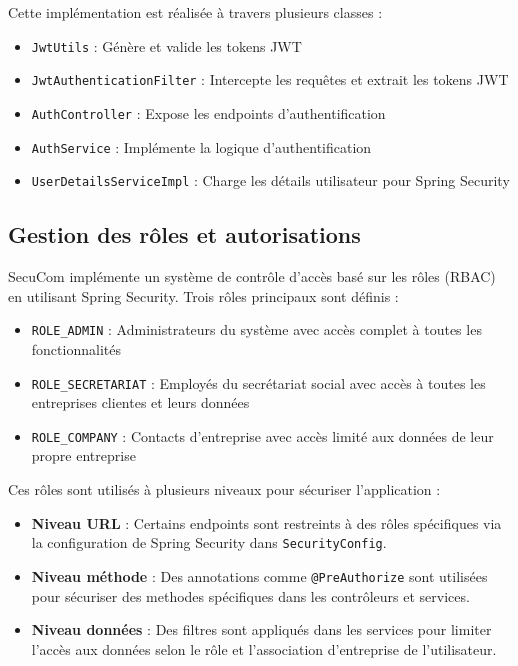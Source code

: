 \documentclass[12pt,a4paper]{report}
\begin{document}
Cette implémentation est réalisée à travers plusieurs classes :

\begin{itemize}
  \item \texttt{JwtUtils} : Génère et valide les tokens JWT
  \item \texttt{JwtAuthenticationFilter} : Intercepte les requêtes et extrait les tokens JWT
  \item \texttt{AuthController} : Expose les endpoints d'authentification
  \item \texttt{AuthService} : Implémente la logique d'authentification
  \item \texttt{UserDetailsServiceImpl} : Charge les détails utilisateur pour Spring Security
\end{itemize}

\subsection{Gestion des rôles et autorisations}

SecuCom implémente un système de contrôle d'accès basé sur les rôles (RBAC) en utilisant Spring Security. Trois rôles principaux sont définis :

\begin{itemize}
  \item \texttt{ROLE\_ADMIN} : Administrateurs du système avec accès complet à toutes les fonctionnalités
  \item \texttt{ROLE\_SECRETARIAT} : Employés du secrétariat social avec accès à toutes les entreprises clientes et leurs données
  \item \texttt{ROLE\_COMPANY} : Contacts d'entreprise avec accès limité aux données de leur propre entreprise
\end{itemize}

Ces rôles sont utilisés à plusieurs niveaux pour sécuriser l'application :

\begin{itemize}
  \item \textbf{Niveau URL} : Certains endpoints sont restreints à des rôles spécifiques via la configuration de Spring Security dans \texttt{SecurityConfig}.
  \item \textbf{Niveau méthode} : Des annotations comme \texttt{@PreAuthorize} sont utilisées pour sécuriser des methodes spécifiques dans les contrôleurs et services.
  \item \textbf{Niveau données} : Des filtres sont appliqués dans les services pour limiter l'accès aux données selon le rôle et l'association d'entreprise de l'utilisateur.
\end{itemize}
\end{document}

